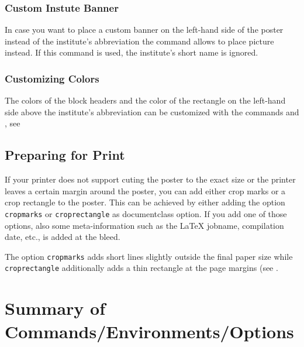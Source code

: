 \subsubsection{Custom Instute Banner}

In case you want to place a custom banner on the left-hand side of the poster instead of the institute's abbreviation the command \texttt{} allows to place picture instead. If this command is used, the institute's short name is ignored.


\subsubsection{Customizing Colors}

The colors of the block headers and the color of the rectangle on the left-hand side above the institute's abbreviation can be customized with the commands \texttt{} and \texttt{}, see 



\subsection{Preparing for Print}

If your printer does not support cuting the poster to the exact size or the printer leaves a certain margin around the poster, you can add either crop marks or a crop rectangle to the poster. This can be achieved by either adding the option \texttt{cropmarks} or \texttt{croprectangle} as documentclass option. If you add one of those options, also some meta-information such as the \LaTeX{} jobname, compilation date, etc., is added at the bleed.

The option \texttt{cropmarks} adds short lines slightly outside the final paper size while \texttt{croprectangle} additionally adds a thin rectangle at the page margins (see .

\section{Summary of Commands/Environments/Options}
\label{sec:reference}

